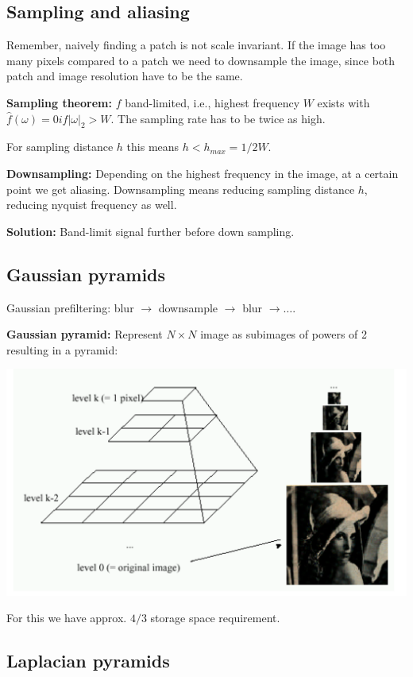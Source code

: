 \subsection{Sampling and aliasing}

Remember, naively finding a patch is not scale invariant. If the image has too many pixels compared to a patch we need to downsample the image, since both patch and image resolution have to be the same.

\textbf{Sampling theorem:} $f$ band-limited, i.e., highest frequency $W$ exists with $\hat{f} (\omega) = 0 if |\omega|_2 > W$. The sampling rate has to be twice as high.

For sampling distance $h$ this means $h < h_{max} = 1/2W$.

\textbf{Downsampling:} Depending on the highest frequency in the image, at a certain point we get aliasing. Downsampling means reducing sampling distance $h$, reducing nyquist frequency as well.

\textbf{Solution:} Band-limit signal further before down sampling.

\subsection{Gaussian pyramids}

Gaussian prefiltering: blur $\rightarrow$ downsample $\rightarrow$ blur $\rightarrow \dots$.

\textbf{Gaussian pyramid:} Represent $N\times N$ image as subimages of powers of 2 resulting in a pyramid:

\includegraphics[width=.7\textwidth]{images/chap4/gaus_pyra}

For this we have approx. $4/3$ storage space requirement.

\subsection{Laplacian pyramids}

